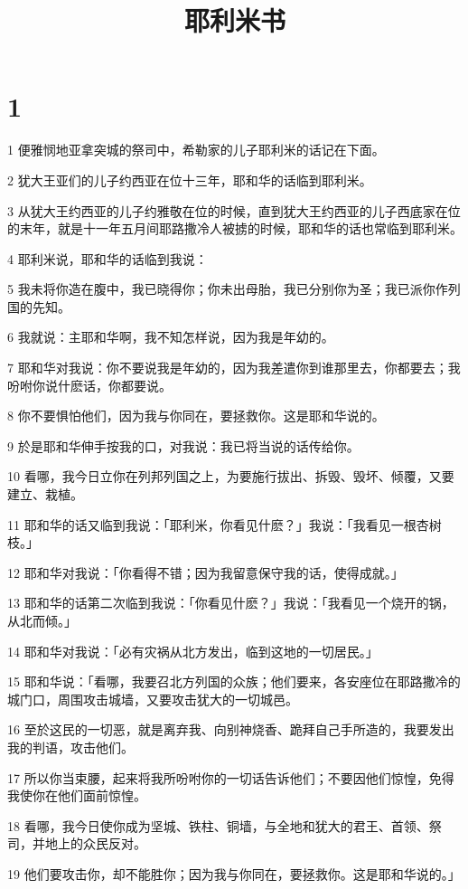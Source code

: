 

\title{耶利米书}


\chapter{1}

\par 1 便雅悯地亚拿突城的祭司中，希勒家的儿子耶利米的话记在下面。
\par 2 犹大王亚们的儿子约西亚在位十三年，耶和华的话临到耶利米。
\par 3 从犹大王约西亚的儿子约雅敬在位的时候，直到犹大王约西亚的儿子西底家在位的末年，就是十一年五月间耶路撒冷人被掳的时候，耶和华的话也常临到耶利米。
\par 4 耶利米说，耶和华的话临到我说：
\par 5 我未将你造在腹中，我已晓得你；你未出母胎，我已分别你为圣；我已派你作列国的先知。
\par 6 我就说：主耶和华啊，我不知怎样说，因为我是年幼的。
\par 7 耶和华对我说：你不要说我是年幼的，因为我差遣你到谁那里去，你都要去；我吩咐你说什麽话，你都要说。
\par 8 你不要惧怕他们，因为我与你同在，要拯救你。这是耶和华说的。
\par 9 於是耶和华伸手按我的口，对我说：我已将当说的话传给你。
\par 10 看哪，我今日立你在列邦列国之上，为要施行拔出、拆毁、毁坏、倾覆，又要建立、栽植。
\par 11 耶和华的话又临到我说：「耶利米，你看见什麽？」我说：「我看见一根杏树枝。」
\par 12 耶和华对我说：「你看得不错；因为我留意保守我的话，使得成就。」
\par 13 耶和华的话第二次临到我说：「你看见什麽？」我说：「我看见一个烧开的锅，从北而倾。」
\par 14 耶和华对我说：「必有灾祸从北方发出，临到这地的一切居民。」
\par 15 耶和华说：「看哪，我要召北方列国的众族；他们要来，各安座位在耶路撒冷的城门口，周围攻击城墙，又要攻击犹大的一切城邑。
\par 16 至於这民的一切恶，就是离弃我、向别神烧香、跪拜自己手所造的，我要发出我的判语，攻击他们。
\par 17 所以你当束腰，起来将我所吩咐你的一切话告诉他们；不要因他们惊惶，免得我使你在他们面前惊惶。
\par 18 看哪，我今日使你成为坚城、铁柱、铜墙，与全地和犹大的君王、首领、祭司，并地上的众民反对。
\par 19 他们要攻击你，却不能胜你；因为我与你同在，要拯救你。这是耶和华说的。」

